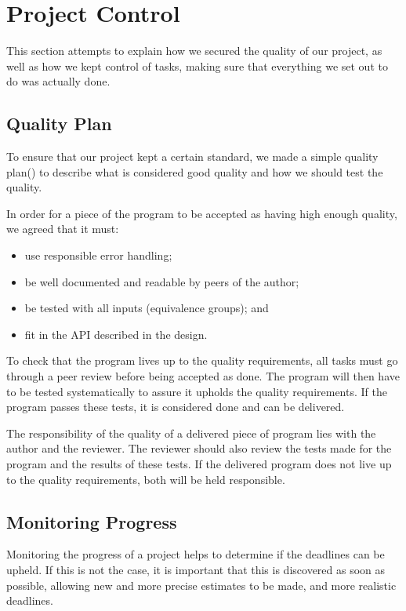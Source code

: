 \section{Project Control}
\label{sec:EmpiriControl}
This section attempts to explain how we secured the quality of our project, as well as how we kept control of tasks, making sure that everything we set out to do was actually done.

\subsection{Quality Plan}
\label{sec:EmpiriQualityControl}
To ensure that our project kept a certain standard, we made a simple quality plan(\cite[ch.~14.4.2]{caye}) to describe what is considered good quality and how we should test the quality.

In order for a piece of the program to be accepted as having high enough quality, we
agreed that it must:

\begin{itemize}
    \item use responsible error handling;
    \item be well documented and readable by peers of the author;
    \item be tested with all inputs (equivalence groups); and
    \item fit in the API described in the design.
\end{itemize}

To check that the program lives up to the quality requirements, all tasks must go through a peer review before being accepted as done. The program will then have to be tested systematically to assure it upholds the quality requirements. If the program passes these tests, it is considered done and can be delivered.

The responsibility of the quality of a delivered piece of program lies with the author
and the reviewer. The reviewer should also review the tests made for the program and
the results of these tests. If the delivered program does not live up to the quality
requirements, both will be held responsible.

\subsection{Monitoring Progress}
\label{sec:EmpiriProgress}

Monitoring the progress of a project helps to determine if the deadlines can be upheld.
If this is not the case, it is important that this is discovered as soon as possible,
allowing new and more precise estimates to be made, and more realistic deadlines.

